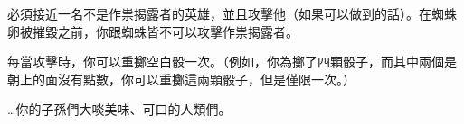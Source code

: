 必須接近一名不是作祟揭露者的英雄，並且攻擊他（如果可以做到的話）。在蜘蛛卵被摧毀之前，你跟蜘蛛皆不可以攻擊作祟揭露者。

每當攻擊時，你可以重擲空白骰一次。（例如，你為擲了四顆骰子，而其中兩個是朝上的面沒有點數，你可以重擲這兩顆骰子，但是僅限一次。）

\begin{HauntStory}
  …你的子孫們大啖美味、可口的人類們。
\end{HauntStory}
